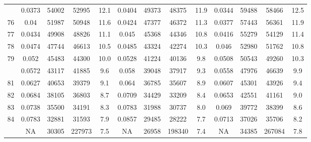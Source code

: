\documentclass[
  14pt,
]{article}
\begin{document}
\begin{longtable}[t]{lcccccccccccc}
\addlinespace
75 & 0.0373 & 54002 & 52995 & 12.1 & 0.0404 & 49373 & 48375 & 11.9 & 0.0344 & 59488 & 58466 & 12.5\\
76 & 0.04 & 51987 & 50948 & 11.6 & 0.0424 & 47377 & 46372 & 11.3 & 0.0377 & 57443 & 56361 & 11.9\\
77 & 0.0434 & 49908 & 48826 & 11.1 & 0.045 & 45368 & 44346 & 10.8 & 0.0416 & 55279 & 54129 & 11.4\\
78 & 0.0474 & 47744 & 46613 & 10.5 & 0.0485 & 43324 & 42274 & 10.3 & 0.046 & 52980 & 51762 & 10.8\\
79 & 0.052 & 45483 & 44300 & 10.0 & 0.0528 & 41224 & 40136 & 9.8 & 0.0508 & 50543 & 49260 & 10.3\\
\addlinespace
80 & 0.0572 & 43117 & 41885 & 9.6 & 0.058 & 39048 & 37917 & 9.3 & 0.0558 & 47976 & 46639 & 9.9\\
81 & 0.0627 & 40653 & 39379 & 9.1 & 0.064 & 36785 & 35607 & 8.9 & 0.0607 & 45301 & 43926 & 9.4\\
82 & 0.0684 & 38105 & 36803 & 8.7 & 0.0709 & 34429 & 33209 & 8.4 & 0.0653 & 42551 & 41161 & 9.0\\
83 & 0.0738 & 35500 & 34191 & 8.3 & 0.0783 & 31988 & 30737 & 8.0 & 0.069 & 39772 & 38399 & 8.6\\
84 & 0.0783 & 32881 & 31593 & 7.9 & 0.0857 & 29485 & 28222 & 7.7 & 0.0713 & 37026 & 35706 & 8.2\\
\addlinespace
85 & NA & 30305 & 227973 & 7.5 & NA & 26958 & 198340 & 7.4 & NA & 34385 & 267084 & 7.8\\*
\end{longtable}
\end{document}
